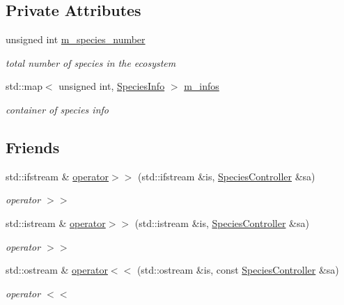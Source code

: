 \subsection*{Private Attributes}
\begin{DoxyCompactItemize}
\item 
\hypertarget{classSpeciesController_aeff7a0500fcf53ad83f4d175adaef85d}{
unsigned int \hyperlink{classSpeciesController_aeff7a0500fcf53ad83f4d175adaef85d}{m\_\-species\_\-number}}
\label{classSpeciesController_aeff7a0500fcf53ad83f4d175adaef85d}

\begin{DoxyCompactList}\small\item\em total number of species in the ecosystem \end{DoxyCompactList}\item 
std::map$<$ unsigned int, \hyperlink{structSpeciesInfo}{SpeciesInfo} $>$ \hyperlink{classSpeciesController_a4e439ccd41d6143680b7a89bd985c8ad}{m\_\-infos}
\begin{DoxyCompactList}\small\item\em container of species info \end{DoxyCompactList}\end{DoxyCompactItemize}
\subsection*{Friends}
\begin{DoxyCompactItemize}
\item 
std::ifstream \& \hyperlink{classSpeciesController_aeb4b1409fd5367b5925f1552ee935aa8}{operator$>$$>$} (std::ifstream \&is, \hyperlink{classSpeciesController}{SpeciesController} \&sa)
\begin{DoxyCompactList}\small\item\em operator $>$$>$ \end{DoxyCompactList}\item 
std::istream \& \hyperlink{classSpeciesController_a26bec2c9a56999b0e717d0b225fbc942}{operator$>$$>$} (std::istream \&is, \hyperlink{classSpeciesController}{SpeciesController} \&sa)
\begin{DoxyCompactList}\small\item\em operator $>$$>$ \end{DoxyCompactList}\item 
\hypertarget{classSpeciesController_abb0fb135115ac68cbc84f562a861d81b}{
std::ostream \& \hyperlink{classSpeciesController_abb0fb135115ac68cbc84f562a861d81b}{operator$<$$<$} (std::ostream \&is, const \hyperlink{classSpeciesController}{SpeciesController} \&sa)}
\label{classSpeciesController_abb0fb135115ac68cbc84f562a861d81b}

\begin{DoxyCompactList}\small\item\em operator $<$$<$ \end{DoxyCompactList}\end{DoxyCompactItemize}


